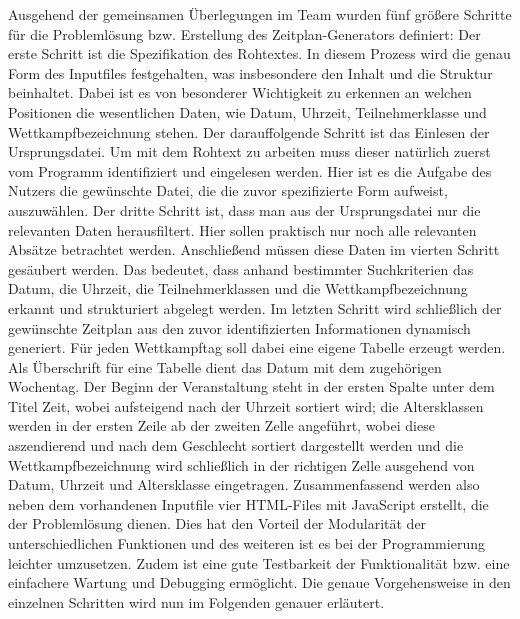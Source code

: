 {Ausgehend der gemeinsamen Überlegungen im Team wurden fünf größere Schritte für die Problemlösung bzw. Erstellung des Zeitplan-Generators definiert: Der erste Schritt ist die Spezifikation des Rohtextes. In diesem Prozess wird die genau Form des Inputfiles festgehalten, was insbesondere den Inhalt und die Struktur beinhaltet. Dabei ist es von besonderer Wichtigkeit zu erkennen an welchen Positionen die wesentlichen Daten, wie Datum, Uhrzeit, Teilnehmerklasse und Wettkampfbezeichnung stehen. Der darauffolgende Schritt ist das Einlesen der Ursprungsdatei. Um mit dem Rohtext zu arbeiten muss dieser natürlich zuerst vom Programm identifiziert und eingelesen werden. Hier ist es die Aufgabe des Nutzers die gewünschte Datei, die die zuvor spezifizierte Form aufweist, auszuwählen. Der dritte Schritt ist, dass man aus der Ursprungsdatei nur die relevanten Daten herausfiltert. Hier sollen praktisch nur noch alle relevanten Absätze betrachtet werden. Anschließend müssen diese Daten im vierten Schritt gesäubert werden. Das bedeutet, dass anhand bestimmter Suchkriterien das Datum, die Uhrzeit, die Teilnehmerklassen und die Wettkampfbezeichnung erkannt und strukturiert abgelegt werden. Im letzten Schritt wird schließlich der gewünschte Zeitplan aus den zuvor identifizierten Informationen dynamisch generiert. Für jeden Wettkampftag soll dabei eine eigene Tabelle erzeugt werden. Als Überschrift für eine Tabelle dient das Datum mit dem zugehörigen Wochentag. Der Beginn der Veranstaltung steht in der ersten Spalte unter dem Titel Zeit, wobei aufsteigend nach der Uhrzeit sortiert wird; die Altersklassen werden in der ersten Zeile ab der zweiten Zelle angeführt, wobei diese aszendierend und nach dem Geschlecht sortiert dargestellt werden und die Wettkampfbezeichnung wird schließlich in der richtigen Zelle ausgehend von Datum, Uhrzeit und Altersklasse eingetragen. 
Zusammenfassend werden also neben dem vorhandenen Inputfile vier HTML-Files mit JavaScript erstellt, die der Problemlösung dienen. Dies hat den Vorteil der Modularität der unterschiedlichen Funktionen und des weiteren ist es bei der Programmierung leichter umzusetzen. Zudem ist eine gute Testbarkeit der Funktionalität bzw. eine einfachere Wartung  und Debugging ermöglicht. Die genaue Vorgehensweise in den einzelnen Schritten wird nun im Folgenden genauer erläutert.

}
